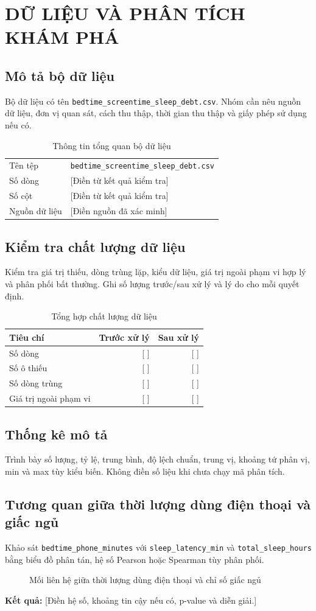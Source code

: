 \chapter{DỮ LIỆU VÀ PHÂN TÍCH KHÁM PHÁ}
\section{Mô tả bộ dữ liệu}
Bộ dữ liệu có tên \texttt{bedtime\_screentime\_sleep\_debt.csv}. Nhóm cần nêu nguồn dữ liệu, đơn vị quan sát, cách thu thập, thời gian thu thập và giấy phép sử dụng nếu có.
\begin{table}[H]\centering
\caption{Thông tin tổng quan bộ dữ liệu}
\begin{tabularx}{0.9\textwidth}{lX}\toprule
Tên tệp & \texttt{bedtime\_screentime\_sleep\_debt.csv}\\
Số dòng & [Điền từ kết quả kiểm tra]\\
Số cột & [Điền từ kết quả kiểm tra]\\
Nguồn dữ liệu & [Điền nguồn đã xác minh]\\
\bottomrule\end{tabularx}\end{table}
\section{Kiểm tra chất lượng dữ liệu}
Kiểm tra giá trị thiếu, dòng trùng lặp, kiểu dữ liệu, giá trị ngoài phạm vi hợp lý và phân phối bất thường. Ghi số lượng trước/sau xử lý và lý do cho mỗi quyết định.
\begin{table}[H]\centering
\caption{Tổng hợp chất lượng dữ liệu}
\begin{tabularx}{0.9\textwidth}{Xrr}\toprule
Tiêu chí & Trước xử lý & Sau xử lý\\\midrule
Số dòng & [ ] & [ ]\\
Số ô thiếu & [ ] & [ ]\\
Số dòng trùng & [ ] & [ ]\\
Giá trị ngoài phạm vi & [ ] & [ ]\\\bottomrule
\end{tabularx}\end{table}
\section{Thống kê mô tả}
Trình bày số lượng, tỷ lệ, trung bình, độ lệch chuẩn, trung vị, khoảng tứ phân vị, min và max tùy kiểu biến. Không điền số liệu khi chưa chạy mã phân tích.
\section{Tương quan giữa thời lượng dùng điện thoại và giấc ngủ}
Khảo sát \texttt{bedtime\_phone\_minutes} với \texttt{sleep\_latency\_min} và \texttt{total\_sleep\_hours} bằng biểu đồ phân tán, hệ số Pearson hoặc Spearman tùy phân phối.
\begin{figure}[H]\centering
{}
\caption{Mối liên hệ giữa thời lượng dùng điện thoại và chỉ số giấc ngủ}\label{fig:phone-sleep}
\end{figure}
\noindent\textbf{Kết quả:} [Điền hệ số, khoảng tin cậy nếu có, p-value và diễn giải.]
